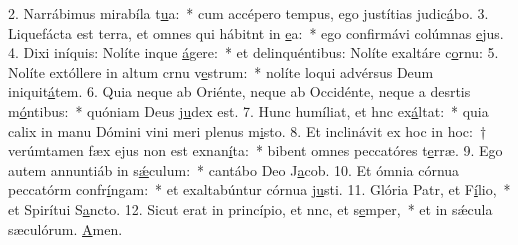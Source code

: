 2. Narrábimus mirabíla t\uline{u}a:~* cum accépero tempus, ego justítias judic\uline{á}bo.
3. Liquefácta est terra, et omnes qui hábitnt in \uline{e}a:~* ego confirmávi colúmnas \uline{e}jus.
4. Dixi iníquis: Nolíte inque \uline{á}gere:~* et delinquéntibus: Nolíte exaltáre c\uline{o}rnu:
5. Nolíte extóllere in altum crnu v\uline{e}strum:~* nolíte loqui advérsus Deum iniquit\uline{á}tem.
6. Quia neque ab Oriénte, neque ab Occidénte, neque a desrtis m\uline{ó}ntibus:~* quóniam Deus j\uline{u}dex est.
7. Hunc humíliat, et hnc ex\uline{á}ltat:~* quia calix in manu Dómini vini meri plenus m\uline{i}sto.
8. Et inclinávit ex hoc in hoc:~† verúmtamen fæx ejus non est exnan\uline{í}ta:~* bibent omnes peccatóres t\uline{e}rræ.
9. Ego autem annuntiáb in s\uline{ǽ}culum:~* cantábo Deo J\uline{a}cob.
10. Et ómnia córnua peccatórm confr\uline{í}ngam:~* et exaltabúntur córnua j\uline{u}sti.
11. Glória Patr, et F\uline{í}lio,~* et Spirítui S\uline{a}ncto.
12. Sicut erat in princípio, et nnc, et s\uline{e}mper,~* et in sǽcula sæculórum. \uline{A}men.
